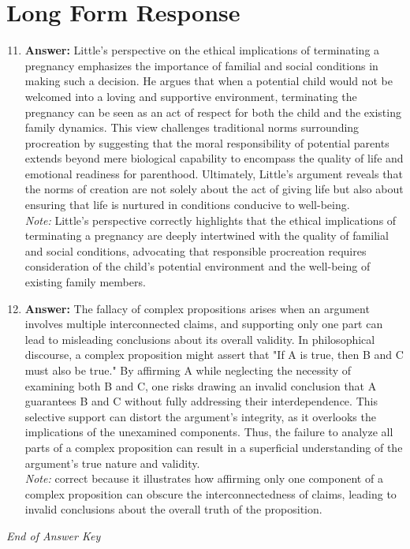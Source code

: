 \documentclass[12pt]{article}
\begin{document}
\section*{Long Form Response}
\begin{enumerate}[label=\arabic*.]
\setcounter{enumi}{10}
\item \textbf{Answer:} Little's perspective on the ethical implications of terminating a pregnancy emphasizes the importance of familial and social conditions in making such a decision. He argues that when a potential child would not be welcomed into a loving and supportive environment, terminating the pregnancy can be seen as an act of respect for both the child and the existing family dynamics. This view challenges traditional norms surrounding procreation by suggesting that the moral responsibility of potential parents extends beyond mere biological capability to encompass the quality of life and emotional readiness for parenthood. Ultimately, Little's argument reveals that the norms of creation are not solely about the act of giving life but also about ensuring that life is nurtured in conditions conducive to well-being.
\\ \textit{Note:} Little's perspective correctly highlights that the ethical implications of terminating a pregnancy are deeply intertwined with the quality of familial and social conditions, advocating that responsible procreation requires consideration of the child's potential environment and the well-being of existing family members.
\item \textbf{Answer:} The fallacy of complex propositions arises when an argument involves multiple interconnected claims, and supporting only one part can lead to misleading conclusions about its overall validity. In philosophical discourse, a complex proposition might assert that "If A is true, then B and C must also be true." By affirming A while neglecting the necessity of examining both B and C, one risks drawing an invalid conclusion that A guarantees B and C without fully addressing their interdependence. This selective support can distort the argument's integrity, as it overlooks the implications of the unexamined components. Thus, the failure to analyze all parts of a complex proposition can result in a superficial understanding of the argument's true nature and validity.
\\ \textit{Note:} correct because it illustrates how affirming only one component of a complex proposition can obscure the interconnectedness of claims, leading to invalid conclusions about the overall truth of the proposition.
\end{enumerate}

\vfill
\noindent\textit{End of Answer Key}
\end{document}

